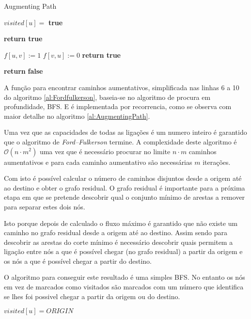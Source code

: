 \documentclass{article}
\begin{document}
\begin{algorithm}[H]
\caption{Augmenting Path}
\label{al:AugmentingPath}
\begin{algorithmic}[1]
  
  \State $visited[u] =$ \textbf{true}
  
    \State \textbf{return true}
  \EndIf
  
      \State $f[u,v] := 1$
	  	\State $f[v,u] := 0$
	  	\State \textbf{return true}
    \EndIf
  \EndFor  
	
	\State \textbf{return} \textbf{false}
\EndFunction
\end{algorithmic}
\end{algorithm}

A função para encontrar caminhos aumentativos, simplificada nas linhas 6 a 10 do algoritmo \ref{al:Fordfulkerson}, baseia-se no algoritmo de procura em profundidade, BFS. E é implementada por recorrencia, como se observa com maior detalhe no algoritmo \ref{al:AugmentingPath}.

Uma vez que as capacidades de todas as ligações é um numero inteiro é garantido que o algoritmo de \textit{Ford–Fulkerson} termine. A complexidade deste algoritmo é $\mathcal{O}(n\cdot m^2)$ uma vez que é necessário procurar no limite $n\cdot m$ caminhos aumentativos e para cada caminho aumentativo são necessárias $m$ iterações. 

Com isto é possível calcular o número de caminhos disjuntos desde a origem até ao destino e obter o grafo residual. O grafo residual é importante para a próxima etapa em que se pretende descobrir qual o conjunto mínimo de arestas a remover para separar estes dois nós.

Isto porque depois de calculado o fluxo máximo é garantido que não existe um caminho no grafo residual desde a origem até ao destino. Assim sendo para descobrir as arestas do corte mínimo é necessário descobrir quais permitem a ligação entre nós a que é possível chegar (no grafo residual) a partir da origem e os nós a que é possível chegar a partir do destino.

O algoritmo para conseguir este resultado é uma simples BFS. No entanto os nós em vez de marcados como visitados são marcados com um número que identifica se lhes foi possivel chegar a partir da origem ou do destino.

\begin{algorithm}[H]
\caption{}
\label{al:walkResidualGraph}
\begin{algorithmic}[1]
  
  \State $visited[u] = ORIGIN$
   
      \State {}
    \EndIf
  \EndFor  
\EndFunction
\end{algorithmic}
\end{algorithm}
\end{document}
